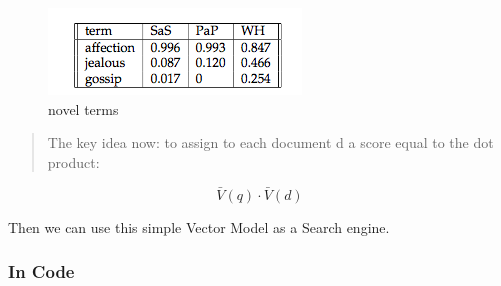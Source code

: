 \documentclass[11pt]{article}
\makeatletter
\def\maxwidth{\ifdim\Gin@nat@width>\linewidth\linewidth
    \else\Gin@nat@width\fi}
\let\Oldincludegraphics\includegraphics
\renewcommand{\includegraphics}[1]{\Oldincludegraphics[width=.8\maxwidth]{#1}}
\makeatother
\begin{document}
\begin{figure}
\centering
\includegraphics{terms2.png}
\caption{novel terms}
\end{figure}

\begin{quote}
The key idea now: to assign to each document d a score equal to the dot
product:
\end{quote}

\[\bar V(q) \cdot \bar V(d)\]

Then we can use this simple Vector Model as a Search engine.

    \subsubsection{In Code}\label{in-code}
\end{document}
